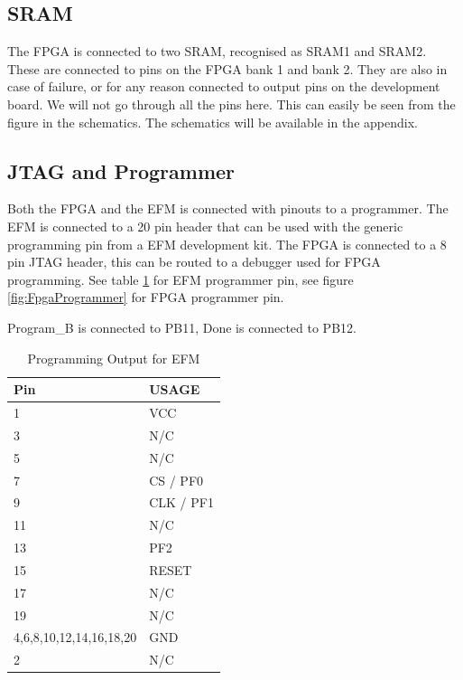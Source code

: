\subsection{SRAM}
The FPGA is connected to two SRAM, recognised as SRAM1 and SRAM2. These are connected to pins on the FPGA bank 1 and bank 2.  They are also in case of failure, or for any reason connected to output pins on the development board. We will not go through all the pins here. This can easily be seen from the figure in the schematics. The schematics will be available in the appendix. 

\subsection{JTAG and Programmer}
Both the FPGA and the EFM is connected with pinouts to a programmer. The EFM is connected to a 20 pin header that can be used with the generic programming pin from a EFM development kit. 
The FPGA is connected to a 8 pin JTAG header, this can be routed to a debugger used for FPGA programming.  See table \ref{tab:EfmProgrammer} for EFM programmer pin, see figure \ref{fig:FpgaProgrammer} for FPGA programmer pin.

Program\_B is connected to PB11, Done is connected to PB12.
\begin{table}[]
    \centering
    \begin{tabular}{ll}
        Pin                     & USAGE     \\
        \hline
        1                       & VCC       \\
        3                       & N/C       \\
        5                       & N/C       \\
        7                       & CS / PF0  \\
        9                       & CLK / PF1 \\
        11                      & N/C       \\
        13                      & PF2       \\
        15                      & RESET     \\
        17                      & N/C       \\
        19                      & N/C       \\
        4,6,8,10,12,14,16,18,20 & GND       \\
        2                       & N/C
    \end{tabular}
    \caption{Programming Output for EFM}
    \label{tab:EfmProgrammer}
\end{table}

